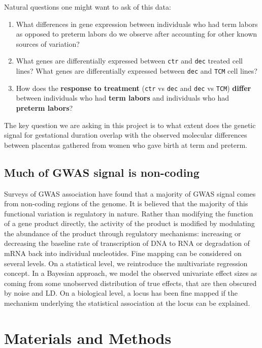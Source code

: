 Natural questions one might want to ask of this data:

\begin{enumerate}
\item What differences in gene expression between individuals who had term labors as opposed to preterm labors do we observe after accounting for other known sources of variation?
\item What genes are differentially expressed between \texttt{ctr} and \texttt{dec} treated cell lines? What genes are differentially expressed between \texttt{dec} and \texttt{TCM} cell lines?
\item How does the \textbf{response to treatment} (\texttt{ctr} vs \texttt{dec} and \texttt{dec} vs \texttt{TCM}) \textbf{differ} between individuals who had \textbf{term labors} and individuals who had \textbf{preterm labors}?
\end{enumerate}

The key question we are asking in this project is to what extent does the genetic signal for gestational duration overlap with the observed molecular differences between placentas gathered from women who gave birth at term and preterm.

\subsection{Much of GWAS signal is non-coding}\label{sec:org3ac0b01}

Surveys of GWAS association have found that a majority of GWAS signal comes from non-coding regions of the genome.  It is believed that the majority 
of this functional variation is regulatory in nature.  Rather than modifying the function of a gene product directly, the activity of the product is modified
by modulating the abundance of the product through regulatory mechanisms: increasing or decreasing the baseline rate of transcription of DNA to RNA or degradation of mRNA back into individual nucleotides.  
Fine mapping can be considered on several levels.
On a statistical level, we reintroduce the multivariate regression concept.  In a Bayesian approach, we model the observed univariate effect sizes as coming from some
unobserved distribution of true effects, that are then obscured by noise and LD. On a biological level,
a locus has been fine mapped if the mechanism underlying the statistical association at the locus can be explained.




\section{Materials and Methods}\label{sec:org39326e2}

